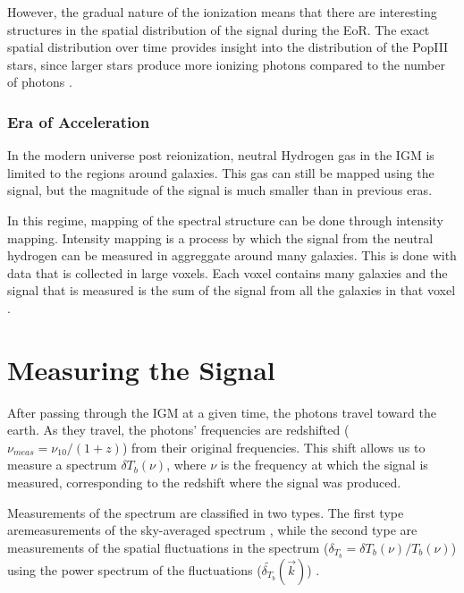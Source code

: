 However, the gradual nature of the ionization means that there are interesting structures in the spatial distribution of the \cm signal during the EoR. The exact spatial distribution over time provides insight into the distribution of the PopIII stars, since larger stars produce more ionizing photons compared to the number of \lya  photons \cite{furlanetto_2006}. 

\subsubsection{Era of Acceleration}
In the modern universe post reionization, neutral Hydrogen gas in the IGM is limited to the regions around galaxies. This gas can still be mapped using the \cm signal, but the magnitude of the signal is much smaller than in previous eras. 

In this regime, mapping of the spectral structure can be done through intensity mapping. Intensity mapping is a process by which the signal from the neutral hydrogen can be measured in aggreggate around many galaxies. This is done with data that is collected in large voxels. Each voxel contains many galaxies and the \cm signal that is measured is the sum of the \cm signal from all the galaxies in that voxel \cite{masui_2012}.

\section{Measuring the \cm Signal}
After passing through the IGM at a given time, the \cm photons travel toward the earth. As they travel, the photons' frequencies are redshifted ($\nu_{meas} = \nu_{10}/(1+z)$) from their original frequencies. This shift allows us to measure a spectrum $\delta T_b (\nu)$, where $\nu$ is the frequency at which the signal is measured, corresponding to the redshift where the signal was produced. 

Measurements of the \cm spectrum are classified in two types. The first type aremeasurements of the sky-averaged spectrum \avgdtb, while the second type are measurements of the spatial fluctuations in the \cm spectrum ($\delta_{T_b} =  \delta T_b (\nu)/ T_b (\nu)$) using the power spectrum of the fluctuations ($ \tilde{ \delta_{T_b} } ( \vec{k} )$) \cite{natarajan_2014}. 

